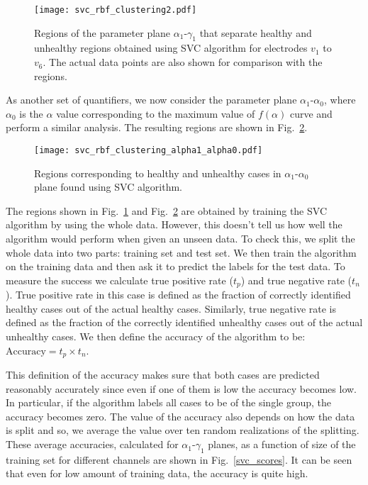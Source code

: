 \documentclass[9pt,twocolumn,twoside]{pnas-new}
\begin{document}
\begin{figure}[h]
\begin{center}
\texttt{[image: svc\_rbf\_clustering2.pdf]}
\caption{\label{svc_rbf} Regions of the parameter plane $\alpha_1$-$\gamma_1$ that separate healthy and unhealthy regions obtained using SVC algorithm for electrodes $v_1$ to $v_6$. The actual data points are also shown for comparison with the regions.}
\end{center}
\end{figure}
As another set of quantifiers, we now consider the parameter plane $\alpha_1$-$\alpha_0$, where $\alpha_0$ is the $\alpha$ value corresponding to the maximum value of $f(\alpha)$ curve and perform a similar analysis. The resulting regions are shown in Fig.~\ref{svc_alpha}.

\begin{figure}[h]
\begin{center}
\texttt{[image: svc\_rbf\_clustering\_alpha1\_alpha0.pdf]}
\caption{\label{svc_alpha} Regions corresponding to healthy and unhealthy cases in $\alpha_1$-$\alpha_0$ plane found using SVC algorithm.}
\end{center}
\end{figure}

The regions shown in Fig.~\ref{svc_rbf} and Fig.~\ref{svc_alpha} are obtained by training the SVC algorithm by using the whole data. However, this doesn't tell us how well the algorithm would perform when given an unseen data. To check this, we split the whole data into two parts: training set and test set. We then train the algorithm on the training data and then ask it to predict the labels for the test data. To measure the success we calculate true positive rate ($t_p$) and true negative rate ($t_n$). True positive rate in this case is defined as the fraction of correctly identified healthy cases out of the actual healthy cases. Similarly, true negative rate is defined as the fraction of the correctly identified unhealthy cases out of the actual unhealthy cases. We then define the accuracy of the algorithm to be: $\text{Accuracy} = t_p \times t_n$.

This definition of the accuracy makes sure that both cases are predicted reasonably accurately since even if one of them is low the accuracy becomes low. In particular, if the algorithm labels all cases to be of the single group, the accuracy becomes zero. The value of the accuracy also depends on how the data is split and so, we average the value over ten random realizations of the splitting. These average accuracies, calculated for $\alpha_1$-$\gamma_1$ planes, as a function of size of the training set for different channels are shown in Fig.~\ref{svc_scores}. It can be seen that even for low amount of training data, the accuracy is quite high. 
\end{document}
